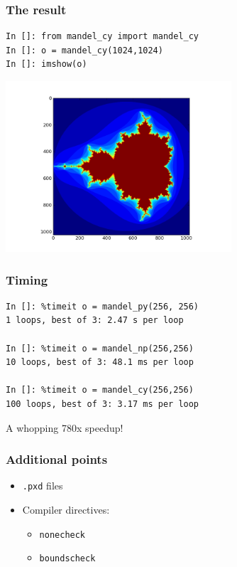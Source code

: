 \documentclass[14pt,compress]{beamer}
\newcounter{time}
\newcommand{\typ}[1]{\lstinline{#1}}
\begin{document}
\begin{frame}
    \frametitle{The result}
\begin{lstlisting}
In []: from mandel_cy import mandel_cy
In []: o = mandel_cy(1024,1024)
In []: imshow(o)
\end{lstlisting}
\vspace*{-1em}
\begin{center}
    \includegraphics[height=2.5in]{data/mandelbrot}
\end{center}
\end{frame}

\begin{frame}[fragile]
    \frametitle{Timing}
    \begin{lstlisting}
In []: %timeit o = mandel_py(256, 256)
1 loops, best of 3: 2.47 s per loop

In []: %timeit o = mandel_np(256,256)
10 loops, best of 3: 48.1 ms per loop

In []: %timeit o = mandel_cy(256,256)
100 loops, best of 3: 3.17 ms per loop
    \end{lstlisting}
A whopping 780x speedup!
\end{frame}

\begin{frame}
    \frametitle{Additional points}
    \begin{itemize}
        \item \typ{.pxd} files
        \item Compiler directives:
            \begin{itemize}
                \item \typ{nonecheck}
                \item \typ{boundscheck}
            \end{itemize}
    \end{itemize}
\end{frame}
\end{document}
